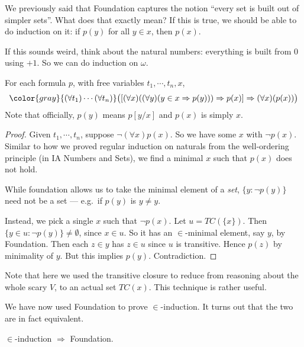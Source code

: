 \documentclass[a4paper]{article}
\begin{document}
We previously said that Foundation captures the notion ``every set is built out of simpler sets''. What does that exactly mean? If this is true, we should be able to do induction on it: if $p(y)$ for all $y\in x$, then $p(x)$.

If this sounds weird, think about the natural numbers: everything is built from $0$ using $+1$. So we can do induction on $\omega$.

\begin{thm}
  For each formula $p$, with free variables $t_1, \cdots, t_n, x$,
  \[
    {\color{gray}{(\forall t_1)\cdots(\forall t_n)}}\big([(\forall x)((\forall y)(y\in x \Rightarrow p(y))) \Rightarrow p(x)] \Rightarrow (\forall x)(p(x))\big)
  \]
  Note that officially, $p(y)$ means $p[y/x]$ and $p(x)$ is simply $x$.
\end{thm}

\begin{proof}
  Given $t_1, \cdots, t_n$, suppose $\neg (\forall x)p(x)$. So we have some $x$ with $\neg p(x)$. Similar to how we proved regular induction on naturals from the well-ordering principle (in IA Numbers and Sets), we find a minimal $x$ such that $p(x)$ does not hold.

  While foundation allows us to take the minimal element of a \emph{set}, $\{y: \neg p(y)\}$ need not be a set --- e.g.\ if $p(y)$ is $y \not= y$.

  Instead, we pick a single $x$ such that $\neg p(x)$. Let $u = TC(\{x\})$. Then $\{y\in u: \neg p(y)\} \not= \emptyset$, since $x\in u$. So it has an $\in$-minimal element, say $y$, by Foundation. Then each $z\in y$ has $z\in u$ since $u$ is transitive. Hence $p(z)$ by minimality of $y$. But this implies $p(y)$. Contradiction.
\end{proof}
Note that here we used the transitive closure to reduce from reasoning about the whole scary $V$, to an actual set $TC(x)$. This technique is rather useful.

We have now used Foundation to prove $\in$-induction. It turns out that the two are in fact equivalent.

\begin{prop}
  $\in$-induction $\Rightarrow $ Foundation.
\end{prop}
\end{document}
